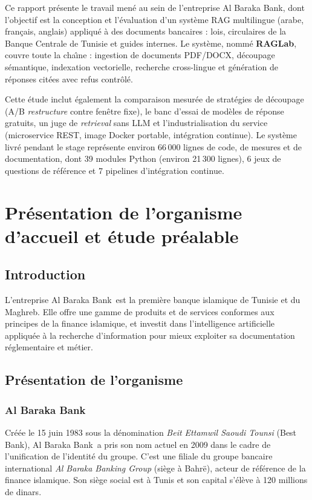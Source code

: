 \documentclass[a4paper,12pt]{report}
\newcommand{\EntrepriseNom}{Al Baraka Bank}               %
\begin{document}
Ce rapport pr\'esente le travail men\'e au sein de l'entreprise \EntrepriseNom, dont l'objectif est la conception et l'\'evaluation d'un syst\`eme RAG multilingue (arabe, fran\c{c}ais, anglais) appliqu\'e \`a des documents bancaires : lois, circulaires de la Banque Centrale de Tunisie et guides internes. Le syst\`eme, nomm\'e \textbf{RAGLab}, couvre toute la cha\^{\i}ne : ingestion de documents PDF/DOCX, d\'ecoupage s\'emantique, indexation vectorielle, recherche cross-lingue et g\'en\'eration de r\'eponses cit\'ees avec refus contr\^ol\'e.

Cette \'etude inclut \'egalement la comparaison mesur\'ee de strat\'egies de d\'ecoupage (A/B \textit{restructure} contre fen\^etre fixe), le banc d'essai de mod\`eles de r\'eponse gratuits, un juge de \textit{retrieval} sans LLM et l'industrialisation du service (microservice REST, image Docker portable, int\'egration continue). Le syst\`eme livr\'e pendant le stage repr\'esente environ 66\,000 lignes de code, de mesures et de documentation, dont 39 modules Python (environ 21\,300 lignes), 6 jeux de questions de r\'ef\'erence et 7 pipelines d'int\'egration continue.

\chapter{Pr\'esentation de l'organisme d'accueil et \'etude pr\'ealable}
\section{Introduction}
L'entreprise \EntrepriseNom\ est la premi\`ere banque islamique de Tunisie et du Maghreb. Elle offre une gamme de produits et de services conformes aux principes de la finance islamique, et investit dans l'intelligence artificielle appliqu\'ee \`a la recherche d'information pour mieux exploiter sa documentation r\'eglementaire et m\'etier.

\section{Pr\'esentation de l'organisme}
\subsection{\EntrepriseNom}
Cr\'e\'ee le 15 juin 1983 sous la d\'enomination \textit{Beit Ettamwil Saoudi Tounsi} (Best Bank), \EntrepriseNom\ a pris son nom actuel en 2009 dans le cadre de l'unification de l'identit\'e du groupe. C'est une filiale du groupe bancaire international \textit{Al Baraka Banking Group} (si\`ege \`a Bahre\"\in), acteur de r\'ef\'erence de la finance islamique. Son si\`ege social est \`a Tunis et son capital s'\'el\`eve \`a 120 millions de dinars.
\end{document}
